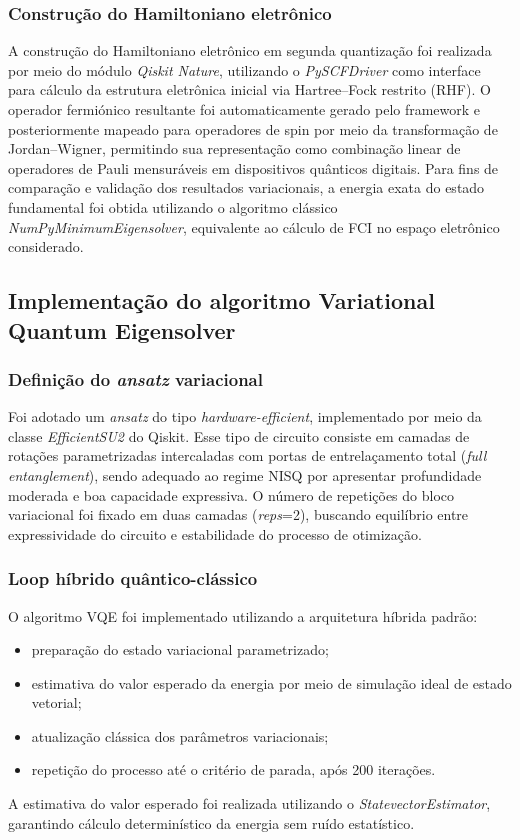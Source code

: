\subsubsection{Construção do Hamiltoniano eletrônico}

A construção do Hamiltoniano eletrônico em segunda quantização foi realizada 
por meio do módulo \textit{Qiskit Nature}, utilizando o \textit{PySCFDriver} 
como interface para cálculo da estrutura eletrônica inicial via Hartree–Fock 
restrito (RHF).
O operador fermiónico resultante foi automaticamente gerado pelo framework e 
posteriormente mapeado para operadores de spin por meio da transformação de 
Jordan–Wigner, permitindo sua representação como combinação linear de 
operadores de Pauli mensuráveis em dispositivos quânticos digitais.
Para fins de comparação e validação dos resultados variacionais, a energia 
exata do estado fundamental foi obtida utilizando o algoritmo clássico 
\textit{NumPyMinimumEigensolver}, equivalente ao cálculo de FCI no espaço 
eletrônico considerado.

\subsection{Implementação do algoritmo Variational Quantum Eigensolver}

\subsubsection{Definição do \textit{ansatz} variacional}

Foi adotado um \textit{ansatz} do tipo \textit{hardware-efficient}, 
implementado por 
meio da classe \textit{EfficientSU2} do Qiskit. Esse tipo de circuito 
consiste em camadas de rotações parametrizadas intercaladas com portas de 
entrelaçamento total (\textit{full entanglement}), sendo adequado ao regime 
NISQ por apresentar profundidade moderada e boa capacidade expressiva.
O número de repetições do bloco variacional foi fixado em duas camadas 
(\textit{reps}=2), buscando equilíbrio entre expressividade do circuito e 
estabilidade do processo de otimização.

\subsubsection{Loop híbrido quântico-clássico}

O algoritmo VQE foi implementado utilizando a arquitetura híbrida padrão:
\begin{itemize}
\item preparação do estado variacional parametrizado;
\item estimativa do valor esperado da energia por meio de simulação ideal de 
estado vetorial;
\item atualização clássica dos parâmetros variacionais;
\item repetição do processo até o critério de parada, após 200 iterações.
\end{itemize}
A estimativa do valor esperado foi realizada utilizando o 
\textit{StatevectorEstimator}, garantindo cálculo determinístico da energia 
sem ruído estatístico.

